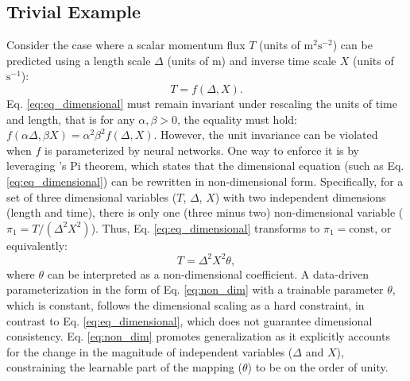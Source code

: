 \documentclass[draft]{agujournal2019}
\begin{document}
\subsection{Trivial Example}

Consider the case where a scalar momentum flux $T$ (units of $\mathrm{m}^2 \mathrm{s}^{-2}$) can be predicted using a length scale $\Delta$ (units of $\mathrm{m}$) and inverse  time scale $X$ (units of $\mathrm{s}^{-1}$):
\begin{equation}
    T = f(\Delta, X). \label{eq:eq_dimensional}
\end{equation}
Eq. \eqref{eq:eq_dimensional} must remain invariant under rescaling the units of time and length, that is for any $\alpha, \beta>0$, the equality must hold: $f( \alpha \Delta, \beta X) = \alpha^2 \beta^2 f(\Delta, X)$. However, the unit invariance can be violated when $f$ is parameterized by neural networks. One way to enforce it is by leveraging 's Pi theorem, which states that the dimensional equation  (such as Eq. \eqref{eq:eq_dimensional}) can be rewritten in non-dimensional form. Specifically, for a set of three dimensional variables ($T$, $\Delta$, $X$) with two independent dimensions (length and time), there is only one (three minus two) non-dimensional variable ($\pi_1=T/ (\Delta^2 X^2)$). Thus, Eq. \eqref{eq:eq_dimensional} transforms to  $\pi_1=\mathrm{const}$, or equivalently: \begin{equation}
    T = \Delta^2 X^2 \theta, \label{eq:non_dim}
\end{equation}
where $\theta$ can be interpreted as a non-dimensional  coefficient. A data-driven parameterization in the form of Eq. \eqref{eq:non_dim} with a trainable parameter $\theta$, which is constant, follows the dimensional scaling as a hard constraint, in contrast to Eq. \eqref{eq:eq_dimensional}, which does not guarantee dimensional consistency. Eq. \eqref{eq:non_dim} promotes generalization as it explicitly accounts for the change in the magnitude of independent variables ($\Delta$ and $X$), constraining the learnable part of the mapping ($\theta$) to be on the order of unity. %
\end{document}
